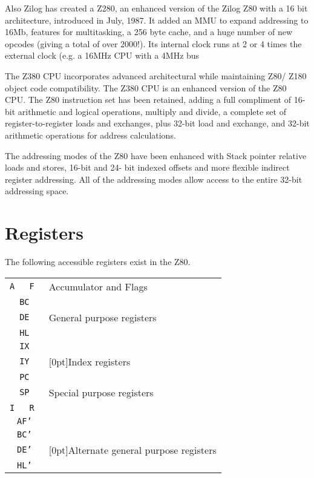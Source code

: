 \documentclass[oneside,a4paper]{book}
\begin{document}
Also Zilog has created a Z280, an enhanced version of the Zilog Z80 with a 16 bit
architecture, introduced in July, 1987. It added an MMU to expand addressing 
to 16Mb, features for multitasking, a 256 byte cache, and a huge number of 
new opcodes (giving a total of over 2000!). Its internal clock runs at 2 
or 4 times the external clock (e.g. a 16MHz CPU with a 4MHz bus

The Z380 CPU incorporates advanced architectural while maintaining Z80/
Z180 object code compatibility. The Z380 CPU is an enhanced version 
of the Z80 CPU. The Z80 instruction set has been retained, adding a full 
compliment of 16-bit arithmetic and logical operations, multiply
and divide, a complete set of register-to-register loads and exchanges, 
plus 32-bit load and exchange, and 32-bit arithmetic operations for 
address calculations.

The addressing modes of the Z80 have been enhanced
with Stack pointer relative loads and stores, 16-bit and 24-
bit indexed offsets and more flexible indirect register
addressing. All of the addressing modes allow access to
the entire 32-bit addressing space.


\section{Registers}

The following accessible registers exist in the Z80. \\[1ex]

\begin{tabular}{|c|c|l} \cline{1-2}
\tt A & \tt F & Accumulator and Flags \\ \cline{1-2} \cline{1-2}
\multicolumn{2}{|c|}{\tt BC} & \\ \cline{1-2}
\multicolumn{2}{|c|}{\tt DE} & General purpose registers \\ \cline{1-2}
\multicolumn{2}{|c|}{\tt HL} & \\ \cline{1-2}
\multicolumn{2}{|c|}{\tt IX} & \\ \cline{1-2}
\multicolumn{2}{|c|}{\tt IY} & \raisebox{1.5ex}[0pt]{Index registers} \\ \cline{1-2}
\multicolumn{2}{|c|}{\tt PC} & \\ \cline{1-2}
\multicolumn{2}{|c|}{\tt SP} & Special purpose registers \\ \cline{1-2}
\tt I & \tt R & \\ \cline{1-2}
\multicolumn{2}{|c|}{\tt AF'} & \\ \cline{1-2}
\multicolumn{2}{|c|}{\tt BC'} & \\ \cline{1-2}
\multicolumn{2}{|c|}{\tt DE'} & \raisebox{1.5ex}[0pt]{Alternate general purpose registers}\\ \cline{1-2}
\multicolumn{2}{|c|}{\tt HL'} & \\ \cline{1-2}
\end{tabular}
\\[1ex]
\end{document}
